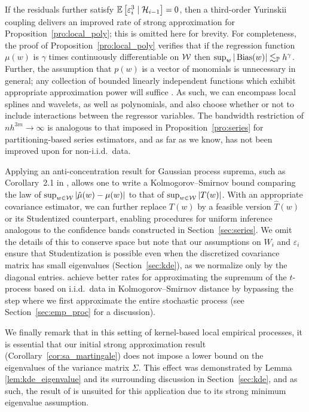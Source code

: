 If the residuals further satisfy
$\mathbb{E} \left[ \varepsilon_i^3 \mid \mathcal{H}_{i-1} \right] = 0$, then
a third-order Yurinskii coupling delivers an improved rate of strong
approximation for Proposition~\ref{pro:local_poly}; this is omitted here for
brevity. For completeness, the proof of Proposition~\ref{pro:local_poly}
verifies that if the regression function $\mu(w)$ is $\gamma$ times
continuously differentiable on $\mathcal{W}$ then
$\sup_w |\operatorname{Bias}(w)| \lesssim_{\mathbb{P}} h^\gamma$. Further, the assumption that $p(w)$
is a vector of monomials is unnecessary in general; any collection of bounded
linearly independent functions which exhibit appropriate approximation power
will suffice \citep{eggermont2009maximum}. As such, we can encompass local
splines and wavelets, as well as polynomials, and also choose whether or not to
include interactions between the regressor variables. The bandwidth restriction
of $n h^{3m} \to \infty$ is analogous to that imposed in
Proposition~\ref{pro:series} for partitioning-based series estimators, and as
far as we know, has not been improved upon for non-i.i.d.\ data.

Applying an anti-concentration result for Gaussian process suprema, such as
Corollary~2.1 in \citet{chernozhukov2014anti}, allows one to write a
Kolmogorov--Smirnov bound comparing the law of
$\sup_{w \in \mathcal{W}}|\hat\mu(w) - \mu(w)|$ to that of $\sup_{w \in \mathcal{W}}|T(w)|$.
With an appropriate covariance estimator, we can further replace $T(w)$ by a
feasible version $\hat T(w)$ or its Studentized counterpart, enabling
procedures for uniform inference analogous to the confidence bands constructed
in Section~\ref{sec:series}. We omit the details of this to conserve space but
note that our assumptions on $W_i$ and $\varepsilon_i$ ensure that
Studentization is possible even when the discretized covariance matrix has
small eigenvalues (Section~\ref{sec:kde}), as we normalize only by the diagonal
entries. \citet[Remark~3.1]{chernozhukov2014gaussian} achieve better rates for
approximating the supremum of the $t$-process based on i.i.d.\ data in
Kolmogorov--Smirnov distance by bypassing the step where we first approximate
the entire stochastic process (see Section~\ref{sec:emp_proc} for a
discussion).

We finally remark that in this setting of kernel-based local empirical
processes, it is essential that our initial strong approximation result
(Corollary~\ref{cor:sa_martingale}) does not impose a lower bound on the
eigenvalues of the variance matrix $\Sigma$. This effect was demonstrated by
Lemma \ref{lem:kde_eigenvalue} and its surrounding discussion in
Section~\ref{sec:kde}, and as such, the result of \citet{li2020uniform} is
unsuited for this application due to its strong minimum eigenvalue assumption.

